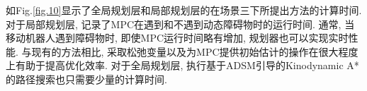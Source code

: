 \documentclass[preprint,5p,times,twocolumn]{elsarticle}
\begin{document}







如Fig.\ref{fig.10}显示了全局规划层和局部规划层的在场景三下所提出方法的计算时间. 
对于局部规划层, 记录了MPC在遇到和不遇到动态障碍物时的运行时间. 
通常, 当移动机器人遇到障碍物时, 即使MPC运行时间略有增加, 规划器也可以实现实时性能. 
与现有的方法相比\citep{jian2022dynamicCB}, 采取松弛变量以及为MPC提供初始估计的操作在很大程度上有助于提高优化效率. 
对于全局规划层, 执行基于ADSM引导的Kinodynamic A*的路径搜索也只需要少量的计算时间. 
\end{document}
